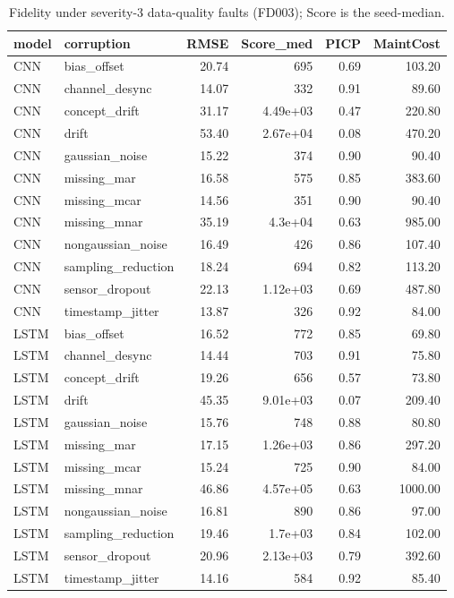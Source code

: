 \begin{table}
\caption{Fidelity under severity-3 data-quality faults (FD003); Score is the seed-median.}
\label{tab:sev3_FD003}
\begin{tabular}{llrrrr}
\toprule  %
model & corruption & RMSE & Score\_med & PICP & MaintCost \\
\midrule
CNN & bias\_offset & 20.74 & 695 & 0.69 & 103.20 \\
CNN & channel\_desync & 14.07 & 332 & 0.91 & 89.60 \\
CNN & concept\_drift & 31.17 & 4.49e+03 & 0.47 & 220.80 \\
CNN & drift & 53.40 & 2.67e+04 & 0.08 & 470.20 \\
CNN & gaussian\_noise & 15.22 & 374 & 0.90 & 90.40 \\
CNN & missing\_mar & 16.58 & 575 & 0.85 & 383.60 \\
CNN & missing\_mcar & 14.56 & 351 & 0.90 & 90.40 \\
CNN & missing\_mnar & 35.19 & 4.3e+04 & 0.63 & 985.00 \\
CNN & nongaussian\_noise & 16.49 & 426 & 0.86 & 107.40 \\
CNN & sampling\_reduction & 18.24 & 694 & 0.82 & 113.20 \\
CNN & sensor\_dropout & 22.13 & 1.12e+03 & 0.69 & 487.80 \\
CNN & timestamp\_jitter & 13.87 & 326 & 0.92 & 84.00 \\
LSTM & bias\_offset & 16.52 & 772 & 0.85 & 69.80 \\
LSTM & channel\_desync & 14.44 & 703 & 0.91 & 75.80 \\
LSTM & concept\_drift & 19.26 & 656 & 0.57 & 73.80 \\
LSTM & drift & 45.35 & 9.01e+03 & 0.07 & 209.40 \\
LSTM & gaussian\_noise & 15.76 & 748 & 0.88 & 80.80 \\
LSTM & missing\_mar & 17.15 & 1.26e+03 & 0.86 & 297.20 \\
LSTM & missing\_mcar & 15.24 & 725 & 0.90 & 84.00 \\
LSTM & missing\_mnar & 46.86 & 4.57e+05 & 0.63 & 1000.00 \\
LSTM & nongaussian\_noise & 16.81 & 890 & 0.86 & 97.00 \\
LSTM & sampling\_reduction & 19.46 & 1.7e+03 & 0.84 & 102.00 \\
LSTM & sensor\_dropout & 20.96 & 2.13e+03 & 0.79 & 392.60 \\
LSTM & timestamp\_jitter & 14.16 & 584 & 0.92 & 85.40 \\

\end{tabular}
\end{table}
